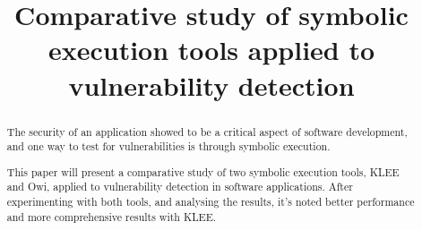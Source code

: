\documentclass[conference]{IEEEtran}
\begin{document}
\title{Comparative study of symbolic execution tools applied to vulnerability detection}

\author{
\and
{}
}

\maketitle

\begin{abstract}
The security of an application showed to be a critical aspect of software development, and one way to test for vulnerabilities is through symbolic execution.

This paper will present a comparative study of two symbolic execution tools, KLEE and Owi, applied to vulnerability detection in software applications. After experimenting with both tools, and analysing the results, it's noted better performance and more comprehensive results with KLEE.
\end{abstract}
\end{document}
